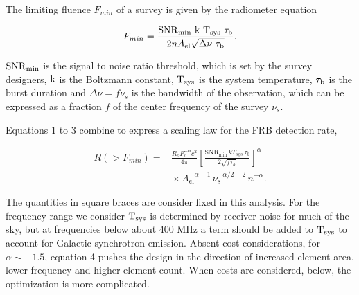 \documentclass[fleqn,usenatbib]{mnras}
\begin{document}
The limiting fluence $F_{min}$ of a survey is given by the radiometer equation

\begin{equation}
	F_{min} =  \frac{\rm{SNR}_{\rm{min}} ~k ~T_{sys} ~\tau_b}{2 n A_{\rm{el}} \sqrt{\Delta \nu ~\tau_{\rm{b}}}} .
\end{equation}

$\rm{SNR}_{\rm{min}}$  is the signal to noise ratio threshold, which is set by the survey designers,
${\rm k }$ is the Boltzmann constant, ${\rm T_{sys}} $  is the system temperature, $\tau_{\rm{b}}$ is the burst duration and $\Delta \nu =f  \nu_s $ is the bandwidth of the observation, which can be expressed as a fraction $f$ of the center frequency of the survey $\nu_s $.

Equations 1 to 3  combine to express a scaling law for the FRB detection rate,

\begin{equation}
\begin{split}
R(>F_{min}) ={}& \frac{R_o F_o^{-\alpha}c^2}{4\pi}
\left[\frac{\mathrm{SNR}_{\mathrm{min}}\,kT_{sys}\,\tau_b}
{2\sqrt{f\tau_b}}\right]^{\alpha} \\
&{}\times A_{\mathrm{el}}^{-\alpha-1}\,
\nu_s^{-\alpha/2-2}\,n^{-\alpha}.
\end{split}
\end{equation}

The quantities in square braces are consider fixed in this analysis.
For the frequency range we consider ${\rm T_{sys}}$ is determined by receiver noise
for much of the sky, but at frequencies below
about 400 MHz a term should be added to ${\rm T_{sys}}$ to account for Galactic synchrotron emission.
Absent cost considerations, for $\alpha \sim -1.5$, equation 4 pushes the design in the direction of increased element area, lower frequency and higher element count. When costs are considered, below, the optimization is more complicated.
\end{document}

